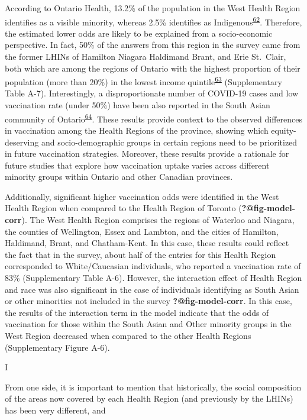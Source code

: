 \documentclass[
  letterpaper,
  DIV=11,
  numbers=noendperiod]{scrartcl}
\begin{document}
According to Ontario Health, 13.2\% of the population in the West Health
Region identifies as a visible minority, whereas 2.5\% identifies as
Indigenous\textsuperscript{\protect\hyperlink{ref-ontariohealth}{62}}.
Therefore, the estimated lower odds are likely to be explained from a
socio-economic perspective. In fact, 50\% of the answers from this
region in the survey came from the former LHINs of Hamilton Niagara
Haldimand Brant, and Erie St.~Clair, both which are among the regions of
Ontario with the highest proportion of their population (more than 20\%)
in the lowest income
quintile\textsuperscript{\protect\hyperlink{ref-buajitti2018}{63}}
(Supplementary Table A-7). Interestingly, a disproportionate number of
COVID-19 cases and low vaccination rate (under 50\%) have been also
reported in the South Asian community of
Ontario\textsuperscript{\protect\hyperlink{ref-anand2022}{64}}. These
results provide context to the observed differences in vaccination among
the Health Regions of the province, showing which equity-deserving and
socio-demographic groups in certain regions need to be prioritized in
future vaccination strategies. Moreover, these results provide a
rationale for future studies that explore how vaccination uptake varies
across different minority groups within Ontario and other Canadian
provinces.

Additionally, significant higher vaccination odds were identified in the
West Health Region when compared to the Health Region of Toronto
(\textbf{?@fig-model-corr}). The West Health Region comprises the
regions of Waterloo and Niagara, the counties of Wellington, Essex and
Lambton, and the cities of Hamilton, Haldimand, Brant, and Chatham-Kent.
In this case, these results could reflect the fact that in the survey,
about half of the entries for this Health Region corresponded to
White/Caucasian individuals, who reported a vaccination rate of 83\%
(Supplementary Table A-6). However, the interaction effect of Health
Region and race was also significant in the case of individuals
identifying as South Asian or other minorities not included in the
survey \textbf{?@fig-model-corr}. In this case, the results of the
interaction term in the model indicate that the odds of vaccination for
those within the South Asian and Other minority groups in the West
Region decreased when compared to the other Health Regions
(Supplementary Figure A-6).

I

From one side, it is important to mention that historically, the social
composition of the areas now covered by each Health Region (and
previously by the LHINs) has been very different, and
\end{document}

